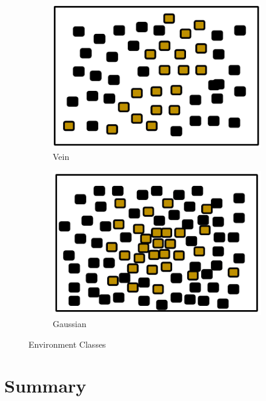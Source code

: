 \begin{figure} [h]
\begin{subfigure}[b]{0.2\textwidth}
                \includegraphics[width=\textwidth]{chapters/chapter4/figures/veinenv.pdf}
                \caption{Vein}
                \label{fig:veinenv}
        \end{subfigure}  
        \begin{subfigure}[b]{0.2\textwidth}
                        \includegraphics[width=\textwidth]{chapters/chapter4/figures/gaussianenv}
                        \caption{Gaussian}
                        \label{fig:gaussianenv}
       \end{subfigure}
        \caption{Environment Classes}\label{fig:environments}
\end{figure}


\section{Summary}
\label{fourth:summary}

